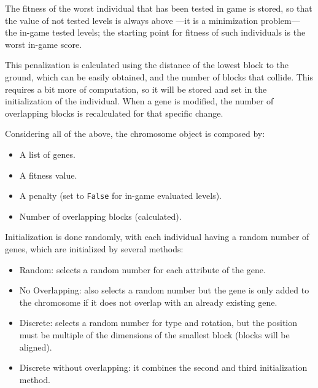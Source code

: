\documentclass[runningheads,a4paper]{llncs}
\begin{document}

The fitness of the worst individual that has been tested in game is
stored, so that the value of not tested levels is always above ---it is a minimization problem--- the in-game 
tested levels; the starting point for fitness of such individuals is the 
worst in-game score.

This penalization is calculated using the distance of the lowest block to the 
ground, which can be easily obtained, and the number of blocks that collide. 
This requires a bit more of computation, so it will be stored and set in the 
initialization of the individual. When a gene is modified, the number of 
overlapping blocks is recalculated for that specific change.

Considering all of the above, the chromosome object is composed by:
\begin{itemize}
	\item A list of genes.
	\item A fitness value.
	\item A penalty (set to {\tt False} for in-game evaluated levels).
	\item Number of overlapping blocks (calculated).
\end{itemize} %


Initialization is done randomly, with each individual having a random number of 
genes, which are initialized by several methods: 

\begin{itemize}
	\item Random: selects a random number for each attribute of the gene.
	\item No Overlapping: also selects a random number but the gene is only 
	added to the chromosome if it does not overlap with an already existing 
	gene.
	\item Discrete: selects a random number for type and rotation, but the 
	position must be multiple of the dimensions of the smallest block (blocks 
	will be aligned).
	\item Discrete without overlapping: it combines the second and third 
	initialization method.
\end{itemize}
\end{document}
